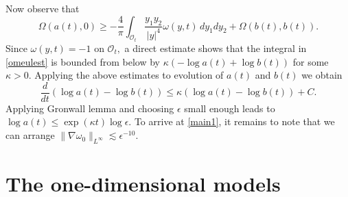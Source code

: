 \documentclass[reqno,centertags, 11pt]{amsart}
\newcommand{\be}{\mathbf e} \newcommand{\bh}{\mathbf h}
\newcommand{\lb}{\label}
\renewcommand{\be}{\begin{equation}}
\newcommand{\ee}{\end{equation}}
\newcommand{\OO}{\mathcal O}
\begin{document}
Now observe that
\be\lb{omeulest} \Omega(a(t), 0) \geq -\frac{4}{\pi} \int_{\OO_t} \frac{y_1y_2}{|y|^4} \omega(y,t)\,dy_1dy_2 + \Omega(b(t), b(t)). \ee
Since $\omega(y,t)=-1$ on $\OO_t,$ a direct estimate shows that the integral in \eqref{omeulest}
is bounded from below by  $\kappa(-\log a(t) + \log b(t) )$  for some $\kappa>0.$ %
Applying the above estimates to evolution of $a(t)$ and $b(t)$ we obtain
\begin{equation}\label{final1}
\frac{d}{dt} \left( \log a(t) - \log b(t) \right) \leq \kappa \left(\log a(t)-\log b(t)\right) +C.
\end{equation}
Applying Gronwall lemma and choosing $\epsilon$ small enough leads to $\log a(t) \leq \exp(\kappa t) \log \epsilon.$
To arrive at \eqref{main1}, it remains to note that
we can arrange $\|\nabla \omega_0\|_{L^\infty} \lesssim \epsilon^{-10}.$



\section{The one-dimensional models}\label{models}
\end{document}
